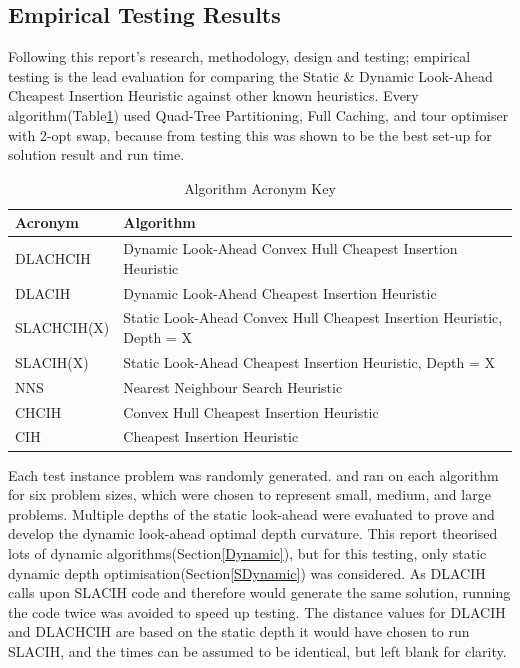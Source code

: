 \subsection{Empirical Testing Results}

Following this report's research, methodology, design and testing; empirical testing is the lead evaluation for comparing the Static \& Dynamic Look-Ahead Cheapest Insertion Heuristic against other known heuristics. Every algorithm(Table\ref{tab:algacry}) used Quad-Tree Partitioning, Full Caching, and tour optimiser with 2-opt swap, because from testing this was shown to be the best set-up for solution result and run time.

\begin{table}[H]
    \centering
    \renewcommand{\arraystretch}{1.2} %
    \begin{tabularx}{\textwidth}{|p{2.5cm}|X|}
    \hline
      \textbf{Acronym}   & \textbf{Algorithm} \\
      \hline
        DLACHCIH & Dynamic Look-Ahead Convex Hull Cheapest Insertion Heuristic\\
        DLACIH & Dynamic Look-Ahead Cheapest Insertion Heuristic \\
        SLACHCIH(X) & Static Look-Ahead Convex Hull Cheapest Insertion Heuristic, Depth = X\\
        SLACIH(X) & Static Look-Ahead Cheapest Insertion Heuristic, Depth = X \\
        NNS & Nearest Neighbour Search Heuristic \\
        CHCIH & Convex Hull Cheapest Insertion Heuristic \\
        CIH & Cheapest Insertion Heuristic \\
        \hline
    \end{tabularx}
    \caption{Algorithm Acronym Key}
    \label{tab:algacry}
\end{table}

Each test instance problem was randomly generated. and ran on each algorithm for six problem sizes, which were chosen to represent small, medium, and large problems. Multiple depths of the static look-ahead were evaluated to prove and develop the dynamic look-ahead optimal depth curvature. \label{test:dynamic}This report theorised lots of dynamic algorithms(Section\ref{Dynamic}), but for this testing, only static dynamic depth optimisation(Section\ref{SDynamic}) was considered. As DLACIH calls upon SLACIH code and therefore would generate the same solution, running the code twice was avoided to speed up testing. The distance values for DLACIH and DLACHCIH are based on the static depth it would have chosen to run SLACIH, and the times can be assumed to be identical, but left blank for clarity.

